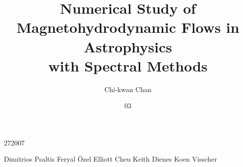 \documentclass[nocopyright,nice]{az}
\begin{document}
\title{Numerical Study of\\
  Magnetohydrodynamic Flows in Astrophysics\\
  with Spectral Methods}
\author{Chi-kwan Chan}
\date{03}{27}{2007}


\committee
  {Dimitrios Psaltis}
  {Feryal \"Ozel}
  {Elliott Cheu}
  {Keith Dienes}
  {Koen Visscher}
\twodirectors %
\maketitle
%
%
%

\tableofcontents\clearpage
\listoffigures\clearpage
\listoftables\clearpage


%

%
%

%
%
%
%
\end{document}
